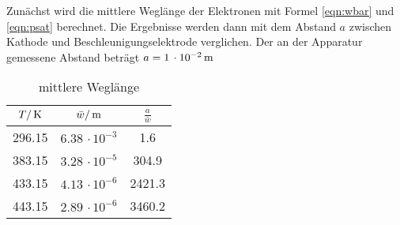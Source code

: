 Zunächst wird die mittlere Weglänge der Elektronen mit Formel \eqref{eqn:wbar}
und \eqref{eqn:psat} berechnet. Die Ergebnisse werden dann mit dem Abstand $a$
zwischen Kathode und Beschleunigungselektrode verglichen. Der an der Apparatur
gemessene Abstand beträgt $a=1\,\cdot10^{-2}\,\si{\meter}$
\begin{table}
  \centering
  \begin{tabular}{ccc}
    \toprule
    $T/\,\si{\kelvin}$ & $\bar w/\,\si{\meter}$ & $\frac{a}{\bar w}$ \\
    \midrule
     296.15 & $6.38\,\cdot 10^{-3}$ &    1.6  \\
     383.15 & $3.28\,\cdot 10^{-5}$ &  304.9  \\
     433.15 & $4.13\,\cdot 10^{-6}$ & 2421.3  \\
     443.15 & $2.89\,\cdot 10^{-6}$ & 3460.2  \\
    \bottomrule
  \end{tabular}
  \caption{mittlere Weglänge}
  \label{tab:weg}
\end{table}

